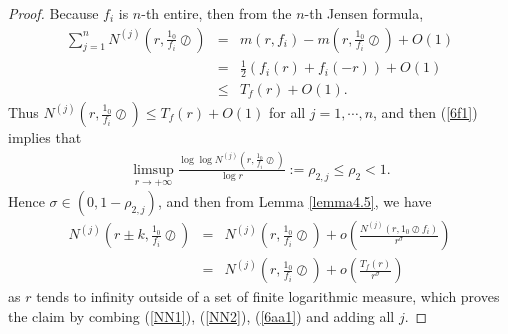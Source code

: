 \documentclass{article}
\begin{document}
\begin{proof}
    Because $f_{i}$ is $n$-th entire, then from the $n$-th Jensen formula,
    \begin{eqnarray*}
        \sum_{j=1}^{n}N^{(j)}\left(r, \frac{1_{0}}{f_{i}}\oslash\right)&=&m(r, f_{i})-m\left(r, \frac{1_{0}}{f_{i}}\oslash\right)+O(1)\\
        &=&\frac{1}{2}(f_{i}(r)+f_{i}(-r))+O(1)\\
        &\leq&T_{f}(r)+O(1).
    \end{eqnarray*}
    Thus $N^{(j)}\left(r, \frac{1_{0}}{f_{i}}\oslash\right)\leq T_{f}(r)+O(1)$ for all $j=1, \cdots, n$, and then (\ref{6f1}) implies that  
    \begin{eqnarray*}
        \limsup\limits_{r\rightarrow +\infty}\frac{\log\log N^{(j)}\left(r, \frac{1_{0}}{f_{i}}\oslash\right)}{\log r}:=\rho_{2, j}\leq \rho_{2}<1.
    \end{eqnarray*}
    Hence $\sigma\in(0, 1-\rho_{2, j})$, and then from Lemma \ref{lemma4.5}, we have
    \begin{eqnarray}\label{6aa1}
        N^{(j)}\left(r\pm k, \frac{1_{0}}{f_{i}}\oslash\right)&=&N^{(j)}\left(r, \frac{1_{0}}{f_{i}}\oslash\right)+o\left(\frac{N^{(j)}(r, 1_{0}\oslash f_{i})}{r^{\sigma}}\right)\nonumber\\
        &=&N^{(j)}\left(r, \frac{1_{0}}{f_{i}}\oslash\right)+o\left(\frac{T_{f}(r)}{r^{\sigma}}\right)
    \end{eqnarray}
    as $r$ tends to infinity outside of a set of finite logarithmic measure, which proves the claim by combing (\ref{NN1}), (\ref{NN2}), (\ref{6aa1}) and adding all $j$.


\end{proof}
\end{document}

